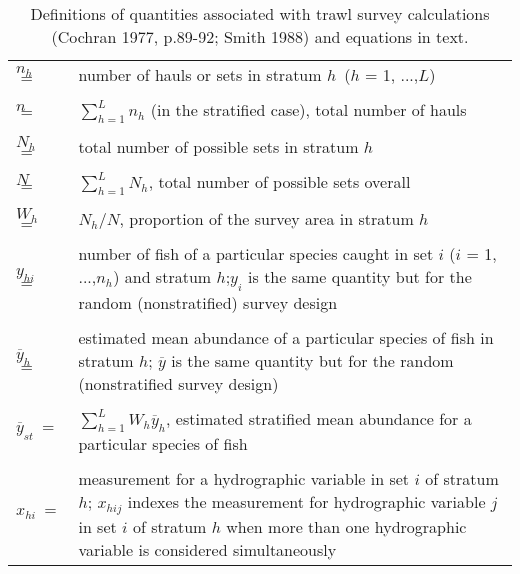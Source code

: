 \documentclass[11pt]{book}\usepackage[]{graphicx}\usepackage[]{color}
\begin{document}
\begin{table}[H]
\centering
\caption{\label{tab:cdfdefs}Definitions of quantities associated with trawl survey calculations (Cochran 1977, p.89-92; Smith 1988) and equations in text.}
\begin{tabular}{p{1.5cm}p{14.5cm}} %
\hline
\hline
$n_h~$ $=$ & number of hauls or sets in stratum $h$~($h$ = 1, ...,$L$)\\
\\
$n~~~$   $=$ & $\sum_{h=1} ^L n_h$ (in the stratified case), total number of hauls\\
\\
$N_h~$ $=$ & total number of possible sets in stratum $h$\\
\\
$N~~$ $=$ & $\sum_{h=1} ^L N_h$, total number of possible sets overall\\
 \\
$W_h$ $=$ & $N_h$/$N$, proportion of the survey area in stratum $h$\\
\\
$y_{hi}~$ $=$ & number of fish of a particular species caught in set $i$ ($i$ = 1, ...,$n_h$) and stratum $h$;$y_i$ is the same quantity but for the random (nonstratified) survey design\\
\\
$\overline{y}_{h}~~$ $=$ & estimated mean abundance of a particular species of fish in stratum $h$; $\overline{y}$ is the same quantity but for the random (nonstratified survey design)\\
\\
$\overline{y}_{st}~ =$ & $\sum_{h=1}^L W_h \overline{y}_{h}$, estimated stratified mean abundance for a particular species of fish\\
\\
$x_{hi}~ =$ & measurement for a hydrographic variable in set $i$ of stratum $h$; $x_{hij}$ indexes the measurement for hydrographic variable $j$ in set $i$ of stratum $h$ when more than one hydrographic variable is considered simultaneously\\
\hline
\end{tabular}
\end{table}
\end{document}
